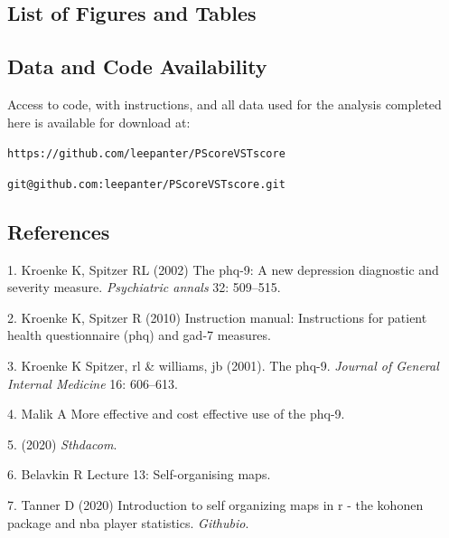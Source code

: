 \documentclass[12pt,]{article}
\begin{document}
\newpage

\hypertarget{list-of-figures-and-tables}{%
\subsection{List of Figures and
Tables}\label{list-of-figures-and-tables}}

\thispagestyle{empty}

\begin{singlespace}
\listoffigures
\listoftables
\end{singlespace}

\newpage

\hypertarget{data-and-code-availability}{%
\subsection{Data and Code
Availability}\label{data-and-code-availability}}

\thispagestyle{empty}

Access to code, with instructions, and all data used for the analysis
completed here is available for download at:

\texttt{https://github.com/leepanter/PScoreVSTscore}

\texttt{git@github.com:leepanter/PScoreVSTscore.git}

\hypertarget{references}{%
\subsection{References}\label{references}}



\hypertarget{refs}{}
\leavevmode\hypertarget{ref-kroenke2002phq}{}%
1. Kroenke K, Spitzer RL (2002) The phq-9: A new depression diagnostic
and severity measure. \emph{Psychiatric annals} 32: 509--515.

\leavevmode\hypertarget{ref-kroenke2010instruction}{}%
2. Kroenke K, Spitzer R (2010) Instruction manual: Instructions for
patient health questionnaire (phq) and gad-7 measures.

\leavevmode\hypertarget{ref-kroenke16spitzer}{}%
3. Kroenke K Spitzer, rl \& williams, jb (2001). The phq-9.
\emph{Journal of General Internal Medicine} 16: 606--613.

\leavevmode\hypertarget{ref-MalikMoreEf}{}%
4. Malik A More effective and cost effective use of the phq-9.

\leavevmode\hypertarget{ref-STHDA_2020}{}%
5. (2020) \emph{Sthdacom}.

\leavevmode\hypertarget{ref-Belavkin}{}%
6. Belavkin R Lecture 13: Self-organising maps.

\leavevmode\hypertarget{ref-Tanner_2020}{}%
7. Tanner D (2020) Introduction to self organizing maps in r - the
kohonen package and nba player statistics. \emph{Githubio}.
\end{document}
